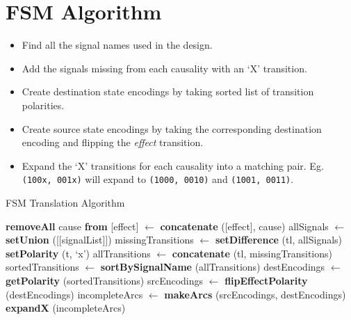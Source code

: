 \section{FSM Algorithm}\label{sec:algo}
\begin{itemize}
	\item Find all the signal names used in the design.
	\item Add the signals missing from each causality with an `X'
		transition.
	\item Create destination state encodings by taking sorted list of
		transition polarities.
	\item Create source state encodings by taking the corresponding
		destination encoding and flipping the \emph{effect} transition.
	\item Expand the `X' transitions for each causality into a matching
		pair. Eg. \texttt{(100x, 001x)} will expand to \texttt{(1000,
		0010)} and \texttt{(1001, 0011)}.
\end{itemize}

\begin{algorithm}[ht]
\begin{algorithmic}
	\caption{FSM Translation Algorithm\label{alg:fsm}}
		\State \textbf{removeAll} cause \textbf{from} [effect]
		\State [signalList] $\leftarrow$ \textbf{concatenate} ([effect], cause)
	\EndFor
	\State allSignals $\leftarrow$ \textbf{setUnion} ([[signalList]])
		\State missingTransitions $\leftarrow$ \textbf{setDifference} (tl, allSignals)
			\State \textbf{setPolarity} (t, `x')
		\EndFor
		\State allTransitions $\leftarrow$ \textbf{concatenate} (tl, missingTransitions)
		\State sortedTransitions $\leftarrow$ \textbf{sortBySignalName} (allTransitions)
		\State destEncodings $\leftarrow$ \textbf{getPolarity} (sortedTransitions)
		\State srcEncodings $\leftarrow$ \textbf{flipEffectPolarity} (destEncodings)
		\State incompleteArcs $\leftarrow$ \textbf{makeArcs} (srcEncodings, destEncodings)
		\State \textbf{expandX} (incompleteArcs)
	\EndFor
\end{algorithmic}
\end{algorithm}
